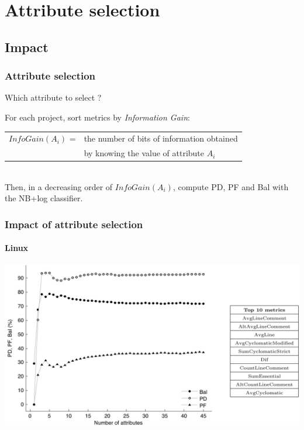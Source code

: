 \section{Attribute selection}
\subsection{Impact}

\begin{frame}
 \frametitle{Attribute selection}
 \begin{center}
  \alert{Which attribute to select ?}
 \end{center}
 For each project, sort metrics by \emph{Information Gain}:\\
 \vspace{0.2cm}
 \begin{tabular}{ll}
  $InfoGain(A_i)$ = & the number of bits of information obtained\\
   & by knowing the value of attribute $A_i$
 \end{tabular}
 \\
 \vspace{0.4cm}
 Then, in a decreasing order of $InfoGain(A_i)$, compute PD, PF and Bal with the NB+log classifier.
\end{frame}

\begin{frame}
 \frametitle{Impact of attribute selection}
 \framesubtitle{Linux}
 \begin{center}
  \includegraphics[width=\textwidth]{figures/attributesLinux.png}
 \end{center}
\end{frame}

